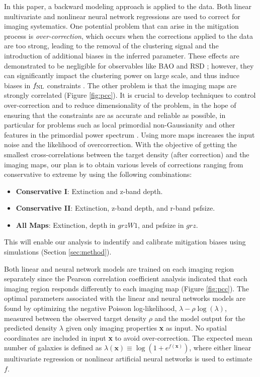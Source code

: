 In this paper, a backward modeling approach is applied to the data. Both linear multivariate and nonlinear neural network regressions are used to correct for imaging systematics. One potential problem that can arise in the mitigation process is \textit{over-correction}, which occurs when the corrections applied to the data are too strong, leading to the removal of the clustering signal and the introduction of additional biases in the inferred parameter. These effects are demonstrated to be negligible for observables like BAO and RSD \citep{merz2021clustering}; however, they can significantly impact the clustering power on large scale, and thus induce biases in $f_{\rm NL}$ constraints \citep{mueller2022primordial, rezaie2021primordial}. The other problem is that the imaging maps are strongly correlated (Figure \ref{fig:pcc}). It is crucial to develop techniques to control over-correction and to reduce dimensionality of the problem, in the hope of ensuring that the constraints are as accurate and reliable as possible, in particular for problems such as local primordial non-Gaussianity and other features in the primordial power spectrum \citep{beutler2019primordial}. Using more maps increases the input noise and the likelihood of overcorrection. With the objective of getting the smallest cross-correlations between the target density (after correction) and the imaging maps, our plan is to obtain various levels of corrections ranging from conservative to extreme by using the following combinations:
\begin{itemize}
\item \textbf{Conservative I}: Extinction and z-band depth.
\item \textbf{Conservative II}: Extinction, z-band depth, and r-band psfsize.
\item \textbf{All Maps}: Extinction, depth in $grzW1$, and psfsize in $grz$.
\end{itemize}
This will enable our analysis to indentify and calibrate mitigation biases using simulations (Section \ref{sec:method}).

Both linear and neural network models are trained on each imaging region separately since the Pearson correlation coefficient analysis indicated that each imaging region responds differently to each imaging map (Figure \ref{fig:pcc}). The optimal parameters associated with the linear and neural networks models are found by optimizing the negative Poisson log-likelihood, $\lambda - \rho \log(\lambda)$, measured between the observed target density $\rho$ and the model output for the predicted density $\lambda$ given only imaging properties \textbf{x} as input. No spatial coordinates are included in input \textbf{x} to avoid over-correction. The expected mean number of galaxies is defined as $\lambda(\textbf{x}) \equiv \log (1+e^{f(\textbf{x})})$, where either linear multivariate regression or nonlinear artificial neural networks is used to estimate $f$. 

